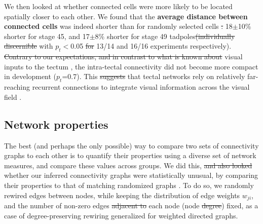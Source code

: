 \documentclass{article}
\providecommand{\DIFaddtex}[1]{{\protect\color{blue}{#1}}} %
\providecommand{\DIFdeltex}[1]{{\protect\color{red}\sout{#1}}}                      %
\providecommand{\DIFaddbegin}{} %
\providecommand{\DIFaddend}{} %
\providecommand{\DIFdelbegin}{} %
\providecommand{\DIFdelend}{} %
\providecommand{\DIFadd}[1]{\texorpdfstring{\DIFaddtex{#1}}{#1}} %
\providecommand{\DIFdel}[1]{\texorpdfstring{\DIFdeltex{#1}}{}} %
\newcommand{\DIFscaledelfig}{0.5}
\newlength{\DIFdelgraphicswidth} %
\newlength{\DIFdelgraphicsheight} %
\newcommand{\DIFaddincludegraphics}[2][]{{\color{blue}\fbox{\DIFOincludegraphics[#1]{#2}}}} %
\newcommand{\DIFdelincludegraphics}[2][]{%
\sbox{\DIFdelgraphicsbox}{\DIFOincludegraphics[#1]{#2}}%
\settoboxwidth{\DIFdelgraphicswidth}{\DIFdelgraphicsbox} %
\settoboxtotalheight{\DIFdelgraphicsheight}{\DIFdelgraphicsbox} %
\scalebox{\DIFscaledelfig}{%
\parbox[b]{\DIFdelgraphicswidth}{\usebox{\DIFdelgraphicsbox}\\[-\baselineskip] \rule{\DIFdelgraphicswidth}{0em}}\llap{\resizebox{\DIFdelgraphicswidth}{\DIFdelgraphicsheight}{%
\setlength{\unitlength}{\DIFdelgraphicswidth}%
\begin{picture}(1,1)%
\thicklines\linethickness{2pt} %
{\color[rgb]{1,0,0}\put(0,0){\framebox(1,1){}}}%
{\color[rgb]{1,0,0}\put(0,0){\line( 1,1){1}}}%
{\color[rgb]{1,0,0}\put(0,1){\line(1,-1){1}}}%
\end{picture}%
}\hspace*{3pt}}} %
} %
\DeclareRobustCommand{\DIFaddbegin}{\DIFOaddbegin \let\includegraphics\DIFaddincludegraphics} %
\DeclareRobustCommand{\DIFaddend}{\DIFOaddend \let\includegraphics\DIFOincludegraphics} %
\DeclareRobustCommand{\DIFdelbegin}{\DIFOdelbegin \let\includegraphics\DIFdelincludegraphics} %
\DeclareRobustCommand{\DIFdelend}{\DIFOaddend \let\includegraphics\DIFOincludegraphics} %
\begin{document}
We then looked at whether connected cells were more likely to be located spatially closer to each other. We found that the \textbf{average distance between connected cells} was indeed shorter than for randomly selected cells \DIFdelbegin \DIFdel{: }\DIFdelend \DIFaddbegin \DIFadd{(}\DIFaddend 18$\pm$10\% shorter for stage 45, and 17$\pm$8\% shorter for stage 49 tadpoles\DIFdelbegin \DIFdel{(individually discernible }\DIFdelend \DIFaddbegin \DIFadd{; connected neurons were closer to each other }\DIFaddend with $p_t<$0.05 \DIFdelbegin \DIFdel{for }\DIFdelend \DIFaddbegin \DIFadd{in }\DIFaddend 13/14 and 16/16 \DIFaddbegin \DIFadd{individual }\DIFaddend experiments respectively). \DIFdelbegin \DIFdel{Contrary to our expectations, and in contrast to what is known about }\DIFdelend \DIFaddbegin \DIFadd{In contrast to }\DIFaddend visual inputs to the tectum \citep{tao2005refinement}, the intra-tectal connectivity did not become more compact in development ($p_t$=0.7). This \DIFdelbegin \DIFdel{suggests }\DIFdelend \DIFaddbegin \DIFadd{may suggest }\DIFaddend that tectal networks rely on relatively far-reaching recurrent connections to integrate visual information across the visual field \citep{baginskas2009recurrent, liu2016jumbo, jang2016}.

\subsection*{Network properties}

The best (and perhaps the only possible) way to compare two sets of \DIFaddbegin \DIFadd{irregular }\DIFaddend connectivity graphs to each other is to quantify their properties using a diverse set of network measures, and compare these values across groups. We did this, \DIFdelbegin \DIFdel{and also looked }\DIFdelend \DIFaddbegin \DIFadd{while also checking }\DIFaddend whether our inferred connectivity graphs were statistically unusual, by comparing their properties to that of matching randomized graphs \citep{ansmann2012surrogate}. To do so, we randomly rewired edges between nodes, while keeping the distribution of edge weights $w_{ji}$, and the number of non-zero edges \DIFdelbegin \DIFdel{adjacent to }\DIFdelend \DIFaddbegin \DIFadd{leaving }\DIFaddend each node (node \DIFdelbegin \DIFdel{degree}\DIFdelend \DIFaddbegin \DIFadd{out-degree}\DIFaddend ) fixed, as a case of degree-preserving rewiring \citep{maslov2002} generalized for weighted directed graphs. 
\end{document}

